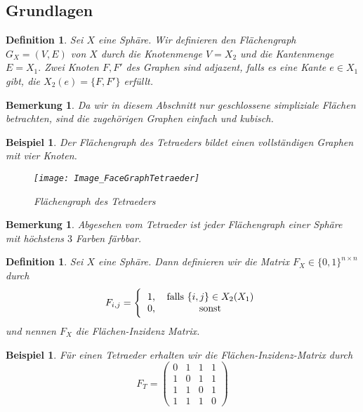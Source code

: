 \documentclass[12pt,titlepage,twoside,cleardoublepage]{article}
\theoremstyle{nummermitklammern}
\newtheorem{bsp}[temp]{Beispiel}
\newtheorem{definition}[temp]{Definition}
\newtheorem{bemerkung}[temp]{Bemerkung}
\newtheorem{definition}[zahl]{Definition}
\newtheorem{bsp}[zahl]{Beispiel}
\newtheorem{bemerkung}[zahl]{Bemerkung}
\numberwithin{equation}{section}
\begin{document}
\subsection{Grundlagen}
\begin{definition}
Sei $X$ eine Sphäre. Wir definieren den Flächengraph $G_X=(V,E)$ von $X$ durch die Knotenmenge $V=X_2$ und die Kantenmenge $E=X_1.$ Zwei Knoten $F,F'$ des Graphen sind adjazent, falls es eine Kante $e\in X_1$ gibt, die $X_2(e)=\{F,F'\}$ erfüllt. 
\end{definition}
\begin{bemerkung}
Da wir in diesem Abschnitt nur geschlossene simpliziale Flächen betrachten, sind die zugehörigen Graphen einfach und kubisch.
\end{bemerkung}
\begin{bsp}
Der Flächengraph des Tetraeders bildet einen vollständigen Graphen mit vier Knoten.
\begin{figure}[H]
\begin{center}
\texttt{[image: Image\_FaceGraphTetraeder]}
\end{center}
\caption{Flächengraph des Tetraeders}
\end{figure}
\end{bsp}
\begin{bemerkung}
Abgesehen vom Tetraeder ist jeder Flächengraph einer Sphäre mit höchstens $3$ Farben färbbar.
\end{bemerkung}
\begin{definition}
Sei $X$ eine Sphäre. Dann definieren wir die Matrix 
$F_X\in \{0,1\}^{n \times n}$ durch
\[
F_{i,j}=
\Biggl\{
\begin{tabular}[l]{lcr}
1,&\textcolor{black}{falls $\{i,j\}\in X_2(X_1)$} \\
0,& sonst\\
\end{tabular}
\] und nennen $F_X$ die Flächen-Inzidenz Matrix. 
\end{definition}
\begin{bsp}
Für einen Tetraeder erhalten wir die Flächen-Inzidenz-Matrix  durch  
\[
F_T=
\left( \begin{array}{rrrrrrrr}
0 & 1 & 1 & 1 \\ 
1 & 0 & 1 & 1 \\
1 & 1 & 0 & 1 \\
1 & 1 & 1 & 0  
\end{array}
\right)
\]

\end{bsp}
\end{document}
